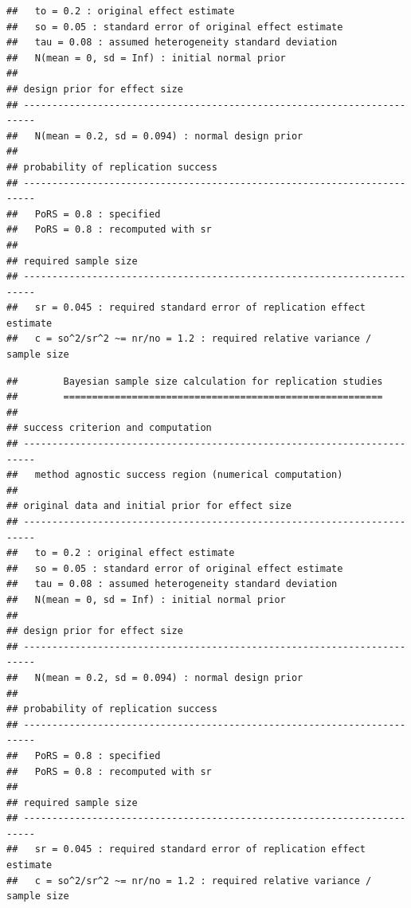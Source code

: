 \begin{subappendices}
\begin{knitrout}
\begin{kframe}
\begin{verbatim}
##   to = 0.2 : original effect estimate
##   so = 0.05 : standard error of original effect estimate
##   tau = 0.08 : assumed heterogeneity standard deviation
##   N(mean = 0, sd = Inf) : initial normal prior
##
## design prior for effect size
## ------------------------------------------------------------------------
##   N(mean = 0.2, sd = 0.094) : normal design prior
##
## probability of replication success
## ------------------------------------------------------------------------
##   PoRS = 0.8 : specified
##   PoRS = 0.8 : recomputed with sr
##
## required sample size
## ------------------------------------------------------------------------
##   sr = 0.045 : required standard error of replication effect estimate
##   c = so^2/sr^2 ~= nr/no = 1.2 : required relative variance / sample size
\end{verbatim}
\begin{alltt}
 \hlkwb{<-} \hlstd{(}\hlstd{) \{}
    \hlcom{## success region is [1.96*sr, Inf)}
    \hlstd{(} \hlstd{=} \hlstd{(}\hlstd{(} \hlstd{=} \hlstd{)}\hlopt{*} \hlstd{))}
\hlstd{\}}
\hlstd{(}     \hlstd{=} \hlstd{)}
\end{alltt}
\begin{verbatim}
##        Bayesian sample size calculation for replication studies
##        ========================================================
##
## success criterion and computation
## ------------------------------------------------------------------------
##   method agnostic success region (numerical computation)
##
## original data and initial prior for effect size
## ------------------------------------------------------------------------
##   to = 0.2 : original effect estimate
##   so = 0.05 : standard error of original effect estimate
##   tau = 0.08 : assumed heterogeneity standard deviation
##   N(mean = 0, sd = Inf) : initial normal prior
##
## design prior for effect size
## ------------------------------------------------------------------------
##   N(mean = 0.2, sd = 0.094) : normal design prior
##
## probability of replication success
## ------------------------------------------------------------------------
##   PoRS = 0.8 : specified
##   PoRS = 0.8 : recomputed with sr
##
## required sample size
## ------------------------------------------------------------------------
##   sr = 0.045 : required standard error of replication effect estimate
##   c = so^2/sr^2 ~= nr/no = 1.2 : required relative variance / sample size
\end{verbatim}
\end{kframe}
\end{knitrout}


\end{subappendices}
